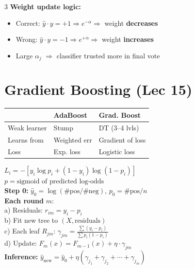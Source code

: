 \documentclass[8pt,letterpaper]{extarticle}
\begin{document}
\begin{multicols}{3}
\textbf{Weight update logic:}
\begin{itemize}
  \item Correct: $\hat{y} \cdot y = +1 \Rightarrow e^{-\alpha} \Rightarrow$ weight \textbf{decreases}
  \item Wrong: $\hat{y} \cdot y = -1 \Rightarrow e^{+\alpha} \Rightarrow$ weight \textbf{increases}
  \item Large $\alpha_j$ $\Rightarrow$ classifier trusted more in final vote
\end{itemize}

\section{Gradient Boosting (Lec 15)}

\begin{center}
\begin{tabular}{@{}lll@{}}
\toprule
 & \textbf{AdaBoost} & \textbf{Grad. Boost} \\
\midrule
Weak learner & Stump & DT (3--4 lvls) \\
Learns from  & Weighted err & Gradient of loss \\
Loss         & Exp. loss & Logistic loss \\
\bottomrule
\end{tabular}
\end{center}

\begin{formulabox}
$L_i = -[y_i\log p_i + (1-y_i)\log(1-p_i)]$\\
$p = \text{sigmoid of predicted log-odds}$\\[2pt]
\textbf{Step 0:} $\hat{y}_0 = \log(\#\text{pos}/\#\text{neg})$,\; $p_0 = \#\text{pos}/n$\\[2pt]
\textbf{Each round } $m$:\\
\quad a) Residuals: $r_{im} = y_i - p_i$\\
\quad b) Fit new tree to $(X, \text{residuals})$\\
\quad c) Each leaf $R_{jm}$: $\gamma_{jm} = \frac{\sum(y_i-p_i)}{\sum p_i(1-p_i)}$\\
\quad d) Update: $F_m(x) = F_{m-1}(x) + \eta\cdot\gamma_{jm}$\\[2pt]
\textbf{Inference:} $\hat{y}_\text{new} = \hat{y}_0 + \eta(\gamma_{j_1}+\gamma_{j_2}+\cdots+\gamma_{j_m})$
\end{formulabox}


\end{multicols}
\end{document}
